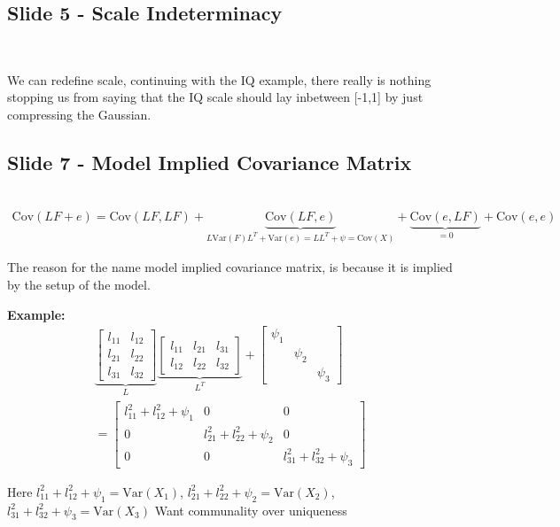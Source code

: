 \subsection{Slide 5 - Scale Indeterminacy}\hfill\\\par
\noindent We can redefine scale, continuing with the IQ example, there really is nothing stopping us from saying that the IQ scale should lay inbetween [-1,1] by just compressing the Gaussian.
\par\bigskip
\subsection{Slide 7 - Model Implied Covariance Matrix}\hfill\\
\begin{equation*}
  \begin{gathered}
    \text{Cov}\left(LF+e\right) = \text{Cov}\left(LF,LF\right)+\underbrace{\text{Cov}\left(LF,e\right)}_{L\text{Var}\left(F\right)L^T+\text{Var}\left(e\right) = LL^T+\psi = \text{Cov}\left(X\right)}+\underbrace{\text{Cov}\left(e,LF\right)}_{\text{$=0$}}+\text{Cov}\left(e,e\right)
  \end{gathered}
\end{equation*}
\par\bigskip
\noindent The reason for the name model implied covariance matrix, is because it is implied by the setup of the model. 
\par\bigskip
\noindent\textbf{Example:}
\begin{equation*}
  \begin{gathered}
    \underbrace{\begin{bmatrix}l_{11}&l_{12}\\l_{21}&l_{22}\\l_{31}&l_{32}\end{bmatrix}}_{\text{$L$}}\underbrace{\begin{bmatrix}l_{11}&l_{21}&l_{31}\\l_{12}&l_{22}&l_{32}\end{bmatrix}}_{\text{$L^T$}} + \begin{bmatrix}\psi_1&\quad&\quad\\\quad&\psi_2&\quad\\\quad&\quad&\psi_3\end{bmatrix}\\
    = \begin{bmatrix}l_{11}^2+l_{12}^2+\psi_1&0&0\\0&l_{21}^2+l_{22}^2+\psi_2&0\\0&0&l_{31}^2+l_{32}^2+\psi_3\end{bmatrix}
  \end{gathered}
\end{equation*}
\par\bigskip
\noindent Here  $l_{11}^2+l_{12}^2+\psi_1 = \text{Var}\left(X_1\right)$, $l_{21}^2+l_{22}^2+\psi_2 = \text{Var}\left(X_2\right)$, $l_{31}^2+l_{32}^2+\psi_3 = \text{Var}\left(X_3\right)$
\noindent Want communality over uniqueness
\par\bigskip
